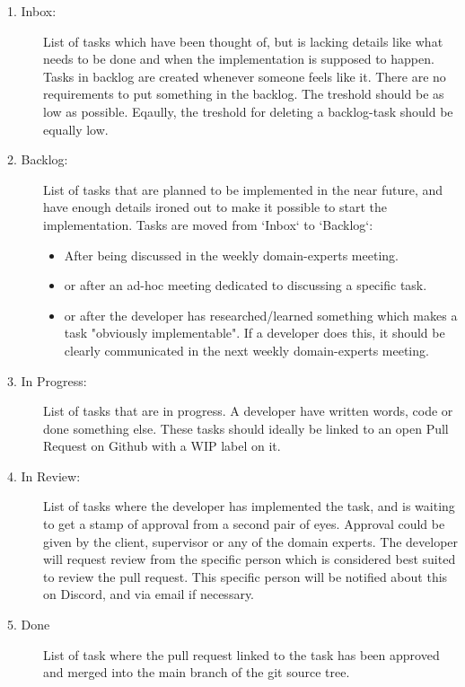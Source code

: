 \begin{description}
    
    \item[1. Inbox:] List of tasks which have been thought of, but is lacking details like what needs to be done and when the implementation is supposed to happen. Tasks in backlog are created whenever someone feels like it. There are no requirements to put something in the backlog. The treshold should be as low as possible. Eqaully, the treshold for deleting a backlog-task should be equally low.
    
    \item[2. Backlog:] List of tasks that are planned to be implemented in the near future, and have enough details ironed out to make it possible to start the implementation. Tasks are moved from `Inbox` to `Backlog`:
        \begin{itemize}
            \item After being discussed in the weekly domain-experts meeting.
            \item or after an ad-hoc meeting dedicated to discussing a specific task.
            \item or after the developer has researched/learned something which makes a task "obviously implementable". If a developer does this, it should be clearly communicated in the next weekly domain-experts meeting.
        \end{itemize}

    \item[3. In Progress:] List of tasks that are in progress. A developer have written words, code or done something else. These tasks should ideally be linked to an open Pull Request on Github with a WIP label on it.

    \item[4. In Review:] List of tasks where the developer has implemented the task, and is waiting to get a stamp of approval from a second pair of eyes. Approval could be given by the client, supervisor or any of the domain experts. The developer will request review from the specific person which is considered best suited to review the pull request. This specific person will be notified about this on Discord, and via email if necessary.

    \item[5. Done] List of task where the pull request linked to the task has been approved and merged into the main branch of the git source tree.

\end{description}




